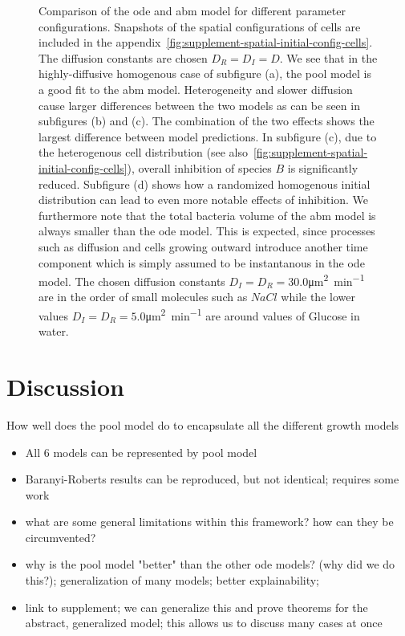 \documentclass[10pt,A4paper]{article}
\numberwithin{equation}{section}
\begin{document}
\begin{figure}
{        Comparison of the \ac{ode} and \ac{abm} model for different parameter configurations.
        Snapshots of the spatial configurations of cells are included in the appendix~\ref{fig:supplement-spatial-initial-config-cells}.
        The diffusion constants are chosen $D_R=D_I=D$.
        We see that in the highly-diffusive homogenous case of subfigure (a), the pool model is a good fit to the \ac{abm} model.
        Heterogeneity and slower diffusion cause larger differences between the two models as can be seen in subfigures (b) and (c).
        The combination of the two effects shows the largest difference between model predictions.
        In subfigure (c), due to the heterogenous cell distribution (see also~\ref{fig:supplement-spatial-initial-config-cells}), overall inhibition of species $B$ is significantly reduced.
        Subfigure (d) shows how a randomized homogenous initial distribution can lead to even more notable effects of inhibition.
        We furthermore note that the total bacteria volume of the \ac{abm} model is always smaller than the \ac{ode} model.
        This is expected, since processes such as diffusion and cells growing outward introduce another time component which is simply assumed to be instantanous in the \ac{ode} model.
        The chosen diffusion constants $D_I=D_R=30.0$\unit{\micro\metre\squared\per\minute} are in the order of small molecules such as $NaCl$ while the lower values $D_I=D_R=5.0$\unit{\micro\metre\squared\per\minute} are around values of Glucose in water.
    }
    \label{fig:spatial-growth-curve}
\end{figure}
%
%
\section{Discussion}

How well does the pool model do to encapsulate all the different growth models
\begin{itemize}
    \item All 6 models can be represented by pool model
    \item Baranyi-Roberts results can be reproduced, but not identical; requires some work
    \item what are some general limitations within this framework? how can they be circumvented?
    \item why is the pool model "better" than the other \ac{ode} models? (why did we do this?);
        generalization of many models; better explainability;
    \item link to supplement; we can generalize this and prove theorems for the abstract,
        generalized model; this allows us to discuss many cases at once
\end{itemize}
\end{document}
